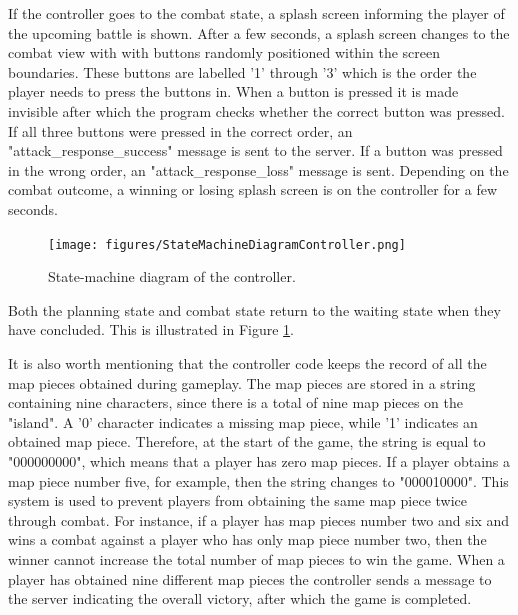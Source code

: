 If the controller goes to the combat state, a splash screen informing the player of the upcoming battle is shown. After a few seconds, a splash screen changes to the combat view with with buttons randomly positioned within the screen boundaries. These buttons are labelled '1' through '3' which is the order the player needs to press the buttons in. When a button is pressed it is made invisible after which the program checks whether the correct button was pressed. If all three buttons were pressed in the correct order, an "attack\_response\_success" message is sent to the server. If a button was pressed in the wrong order, an "attack\_response\_loss" message is sent. Depending on the combat outcome, a winning or losing splash screen is on the controller for a few seconds. 

\begin{figure}
	\centering
	\texttt{[image: figures/StateMachineDiagramController.png]}
	\caption{State-machine diagram of the controller. \label{fig:stateMachine}}
\end{figure}

Both the planning state and combat state return to the waiting state when they have concluded.  This is illustrated in Figure \ref{fig:stateMachine}.

It is also worth mentioning that the controller code keeps the record of all the map pieces obtained during gameplay. The map pieces are stored in a string containing nine characters, since there is a total of nine map pieces on the "island". A '0' character indicates a missing map piece, while '1' indicates an obtained map piece. Therefore, at the start of the game, the string is equal to "000000000", which means that a player has zero map pieces. If a player obtains a map piece number five, for example, then the string changes to "000010000". This system is used to prevent players from obtaining the same map piece twice through combat. For instance, if a player has map pieces number two and six and wins a combat against a player who has only map piece number two, then the winner cannot increase the total number of map pieces to win the game. When a player has obtained nine different map pieces the controller sends a message to the server indicating the overall victory, after which the game is completed. 

